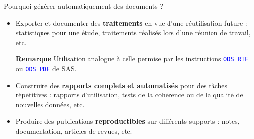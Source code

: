 \documentclass[12pt,ignorenonframetext,handout,]{beamer}
\providecommand{\tightlist}{%
  \setlength{\itemsep}{0pt}\setlength{\parskip}{0pt}}
\begin{document}
\begin{frame}{\large Pourquoi générer automatiquement des documents ?}
\protect\hypertarget{pourquoi-generer-automatiquement-des-documents}{}

\begin{itemize}
\item
  Exporter et documenter des \textbf{traitements} en vue d’une
  réutilisation future : statistiques pour une étude, traitements
  réalisés lors d’une réunion de travail, etc.

  \vspace{0.2cm} \small  \textbf{Remarque} Utilisation analogue à celle
  permise par les instructions \textcolor{blue}{\texttt{ODS RTF}} ou
  \textcolor{blue}{\texttt{ODS PDF}} de SAS.
\end{itemize}

\pause \normalsize

\begin{itemize}
\tightlist
\item
  Construire des \textbf{rapports complets et automatisés} pour des
  tâches répétitives : rapports d’utilisation, tests de la cohérence ou
  de la qualité de nouvelles données, etc.
\end{itemize}

\pause \vspace{0.2cm}

\begin{itemize}
\tightlist
\item
  Produire des publications \textbf{reproductibles} sur différents
  supports : notes, documentation, articles de revues, etc.
\end{itemize}

\end{frame}
\end{document}
